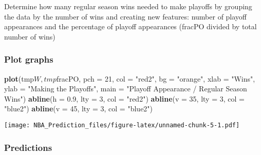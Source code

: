 \documentclass[]{article}
\newenvironment{Shaded}{\begin{snugshade}}{\end{snugshade}}
\newcommand{\KeywordTok}[1]{\textcolor[rgb]{0.13,0.29,0.53}{\textbf{{#1}}}}
\newcommand{\DataTypeTok}[1]{\textcolor[rgb]{0.13,0.29,0.53}{{#1}}}
\newcommand{\DecValTok}[1]{\textcolor[rgb]{0.00,0.00,0.81}{{#1}}}
\newcommand{\FloatTok}[1]{\textcolor[rgb]{0.00,0.00,0.81}{{#1}}}
\newcommand{\StringTok}[1]{\textcolor[rgb]{0.31,0.60,0.02}{{#1}}}
\newcommand{\NormalTok}[1]{{#1}}
\begin{document}
Determine how many regular season wins needed to make playoffs by
grouping the data by the number of wins and creating new features:
number of playoff appearances and the percentage of playoff appearances
(fracPO divided by total number of wins)

\begin{Shaded}
\end{Shaded}

\subsubsection{Plot graphs}\label{plot-graphs}

\begin{Shaded}
\begin{Highlighting}[]
\KeywordTok{plot}\NormalTok{(tmp$W, tmp$fracPO, }\DataTypeTok{pch =} \DecValTok{21}\NormalTok{, }\DataTypeTok{col =} \StringTok{"red2"}\NormalTok{, }\DataTypeTok{bg =} \StringTok{"orange"}\NormalTok{, }
     \DataTypeTok{xlab =} \StringTok{"Wins"}\NormalTok{, }\DataTypeTok{ylab =} \StringTok{"Making the Playoffs"}\NormalTok{, }\DataTypeTok{main =} \StringTok{"Playoff Appearance / Regular Season Wins"}\NormalTok{)}
\KeywordTok{abline}\NormalTok{(}\DataTypeTok{h =} \FloatTok{0.9}\NormalTok{, }\DataTypeTok{lty =} \DecValTok{3}\NormalTok{, }\DataTypeTok{col =} \StringTok{"red2"}\NormalTok{)}
\KeywordTok{abline}\NormalTok{(}\DataTypeTok{v =} \DecValTok{35}\NormalTok{, }\DataTypeTok{lty =} \DecValTok{3}\NormalTok{, }\DataTypeTok{col =} \StringTok{"blue2"}\NormalTok{)}
\KeywordTok{abline}\NormalTok{(}\DataTypeTok{v =} \DecValTok{45}\NormalTok{, }\DataTypeTok{lty =} \DecValTok{3}\NormalTok{, }\DataTypeTok{col =} \StringTok{"blue2"}\NormalTok{)}
\end{Highlighting}
\end{Shaded}

\texttt{[image: NBA\_Prediction\_files/figure-latex/unnamed-chunk-5-1.pdf]}

\subsubsection{Predictions}\label{predictions}
\end{document}
